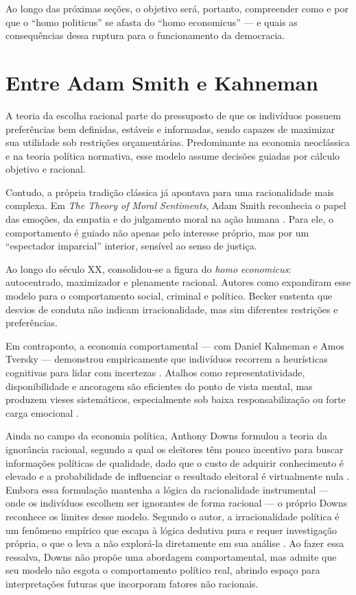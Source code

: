 Ao longo das próximas seções, o objetivo será, portanto, compreender como e por que o ``homo politicus'' se afasta do ``homo economicus'' — e quais as consequências dessa ruptura para o funcionamento da democracia.

\section{Entre Adam Smith e Kahneman} %

A teoria da escolha racional parte do pressuposto de que os indivíduos possuem preferências bem definidas, estáveis e informadas, sendo capazes de maximizar sua utilidade sob restrições orçamentárias. Predominante na economia neoclássica e na teoria política normativa, esse modelo assume decisões guiadas por cálculo objetivo e racional.

Contudo, a própria tradição clássica já apontava para uma racionalidade mais complexa. Em \textit{The Theory of Moral Sentiments}, Adam Smith reconhecia o papel das emoções, da empatia e do julgamento moral na ação humana \cite{smith1759-theory-of-moral-sentiments}. Para ele, o comportamento é guiado não apenas pelo interesse próprio, mas por um ``espectador imparcial'' interior, sensível ao senso de justiça.

Ao longo do século XX, consolidou-se a figura do \textit{homo economicus}: autocentrado, maximizador e plenamente racional. Autores como  expandiram esse modelo para o comportamento social, criminal e político. Becker sustenta que desvios de conduta não indicam irracionalidade, mas sim diferentes restrições e preferências.

Em contraponto, a economia comportamental — com Daniel Kahneman e Amos Tversky — demonstrou empiricamente que indivíduos recorrem a heurísticas cognitivas para lidar com incertezas \cite{Judgment_under_Uncertainty}. Atalhos como representatividade, disponibilidade e ancoragem são eficientes do ponto de vista mental, mas produzem vieses sistemáticos, especialmente sob baixa responsabilização ou forte carga emocional \cite{kahneman2011thinking}.

Ainda no campo da economia política, Anthony Downs formulou a teoria da ignorância racional, segundo a qual os eleitores têm pouco incentivo para buscar informações políticas de qualidade, dado que o custo de adquirir conhecimento é elevado e a probabilidade de influenciar o resultado eleitoral é virtualmente nula \cite{downs1957economic}. Embora essa formulação mantenha a lógica da racionalidade instrumental — onde os indivíduos escolhem ser ignorantes de forma racional — o próprio Downs reconhece os limites desse modelo. Segundo o autor, a irracionalidade política é um fenômeno empírico que escapa à lógica dedutiva pura e requer investigação própria, o que o leva a não explorá-la diretamente em sua análise \cite[p.~10]{downs1957economic}. Ao fazer essa ressalva, Downs não propõe uma abordagem comportamental, mas admite que seu modelo não esgota o comportamento político real, abrindo espaço para interpretações futuras que incorporam fatores não racionais.

